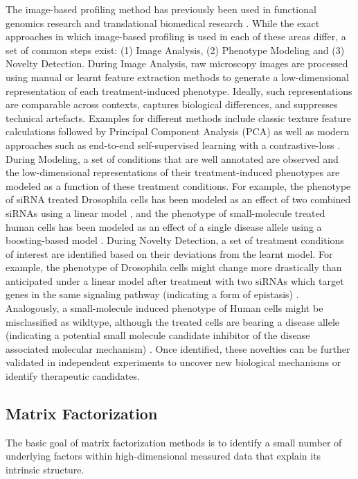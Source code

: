 \begin{flushleft}
The image-based profiling method has previously been used in functional genomics research \citep{billmannGeneticInteractionMap2016} and translational biomedical research \citep{gibsonStrategyIdentifyingRepurposed2015}. While the exact approaches in which image-based profiling is used in each of these areas differ, a set of common steps exist: (1) Image Analysis, (2) Phenotype Modeling and (3) Novelty Detection. During Image Analysis, raw microscopy images are processed using manual or learnt feature extraction methods to generate a low-dimensional representation of each treatment-induced phenotype. Ideally, such representations are comparable across contexts, captures biological differences, and suppresses technical artefacts. Examples for different methods include classic texture feature calculations followed by Principal Component Analysis (PCA) \citep{caicedoDataanalysisStrategiesImagebased2017} as well as modern approaches such as end-to-end self-supervised learning with a contrastive-loss \citep{perakisContrastiveLearningSingleCell2021}. During Modeling, a set of conditions that are well annotated are observed and the low-dimensional representations of their treatment-induced phenotypes are modeled as a function of these treatment conditions. For example, the phenotype of siRNA treated Drosophila cells has been modeled as an effect of two combined siRNAs using a linear model \citep{billmannGeneticInteractionMap2016}, and the phenotype of small-molecule treated human cells has been modeled as an effect of a single disease allele using a boosting-based model \citep{gibsonStrategyIdentifyingRepurposed2015}. During Novelty Detection, a set of treatment conditions of interest are identified based on their deviations from the learnt model. For example, the phenotype of Drosophila cells might change more drastically than anticipated under a linear model after treatment with two siRNAs which target genes in the same signaling pathway (indicating a form of epistasis) \citep{billmannGeneticInteractionMap2016}. Analogously, a small-molecule induced phenotype of Human cells might be misclassified as wildtype, although the treated cells are bearing a disease allele (indicating a potential small molecule candidate inhibitor of the disease associated molecular mechanism) \citep{gibsonStrategyIdentifyingRepurposed2015}. Once identified, these novelties can be further validated in independent experiments to uncover new biological mechanisms or identify therapeutic candidates.
\par

\subsection{Matrix Factorization}
The basic goal of matrix factorization methods is to identify a small number of underlying factors within high-dimensional measured data that explain its intrinsic structure. 


\end{flushleft}
